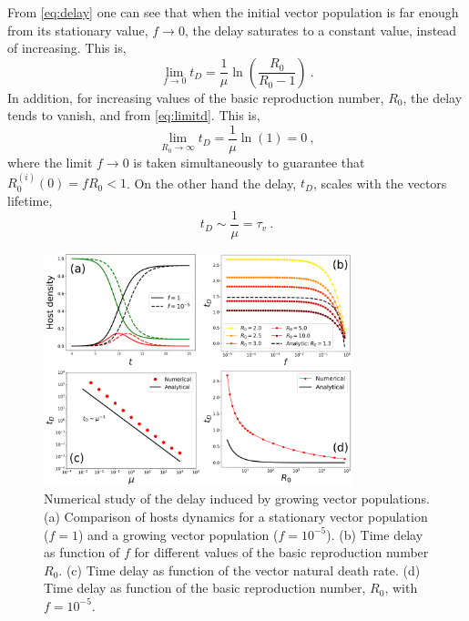 From \cref{eq:delay} one can see that when the initial vector population
is far enough from its stationary value, $f\rightarrow 0$, the delay saturates
to a constant value, instead of increasing. This is,
\begin{equation}
    \lim_{f\to0}t_D=\frac{1}{\mu}\ln(\frac{R_0}{R_0-1}) \ .
    \label{eq:limitd}
\end{equation}
In addition, for increasing values of the basic reproduction number, $R_0$,
the delay tends to vanish, and from \cref{eq:limitd}. This is,
\begin{equation}
    \label{eq:limit_tD_infty}
    \lim_{R_0\to\infty}t_D=\frac{1}{\mu}\ln(1)=0\ ,
\end{equation}
where the limit $f\rightarrow 0$ is taken simultaneously to guarantee that
$R_0^{(i)}(0)=f R_0<1$. On the other hand the delay, $t_D$, scales with the
vectors lifetime,
\begin{equation}
    t_D\sim\frac{1}{\mu}=\tau_v \ .
\end{equation}

\begin{figure}[H]
    \centering
    \includegraphics[width=0.8\textwidth]{Figures/delay.pdf}
    \caption{Numerical study of the delay induced by growing vector
    populations. (a) Comparison of hosts dynamics for a stationary vector
    population ($f=1$) and a growing vector population ($f=10^{-5}$). (b) Time
    delay as function of $f$ for different values of the basic reproduction
    number
    $R_0$. (c) Time delay as function of the vector natural death rate. (d)
    Time
    delay as function of the basic reproduction number, $R_0$, with
    $f=10^{-5}$.}
    \label{fig:delay}
\end{figure}

